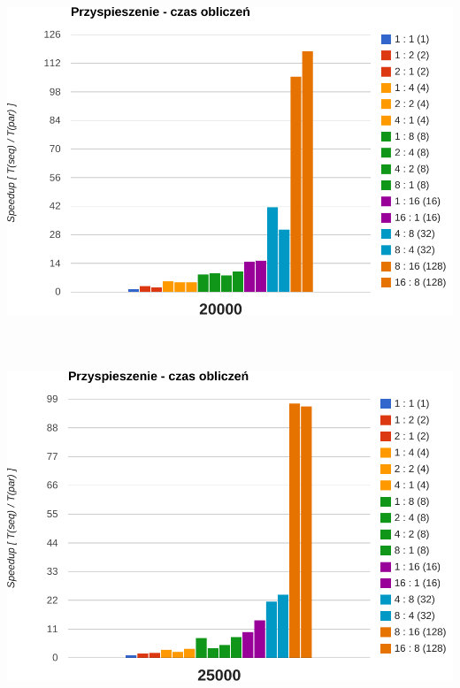 \documentclass[paper=a4, fontsize=11pt]{scrartcl}	%
\numberwithin{equation}{section}		%
\numberwithin{figure}{section}			%
\numberwithin{table}{section}				%
\begin{document}
\includegraphics[width=135mm]{report/comp-speedup-20000.pdf} \\ \ \\ \ \\ \ \\

\includegraphics[width=135mm]{report/comp-speedup-25000.pdf} \\ \ \\ \ \\ \ \\
\end{document}
